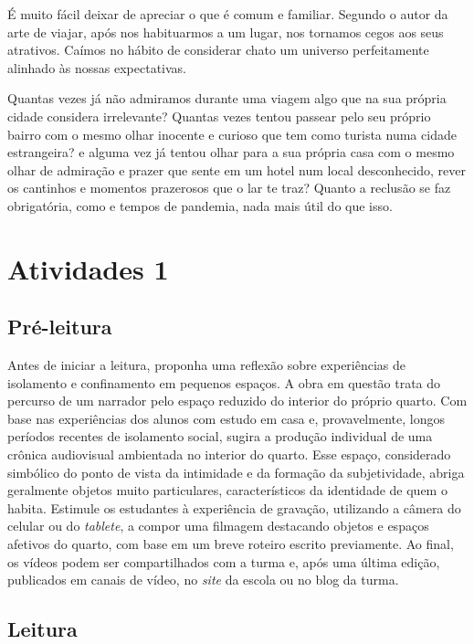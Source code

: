 \documentclass[12pt]{extarticle}
\begin{document}
É muito fácil deixar de apreciar o que é comum e familiar. Segundo o autor da arte de viajar, após nos habituarmos a um lugar, nos tornamos cegos aos seus atrativos. Caímos no hábito de considerar chato um universo perfeitamente alinhado às nossas expectativas.

Quantas vezes já não admiramos durante uma viagem algo que na sua própria cidade considera irrelevante? Quantas vezes tentou passear pelo seu próprio bairro com o mesmo olhar inocente e curioso que tem como turista numa cidade estrangeira? e alguma vez já tentou olhar para a sua própria casa com o mesmo olhar de admiração e prazer que sente em um hotel num local desconhecido, rever os cantinhos e momentos prazerosos que o lar te traz? Quanto a reclusão se faz obrigatória, como e tempos de pandemia, nada mais útil do que isso. 



\section{Atividades 1}


\subsection{Pré-leitura}


Antes de iniciar a leitura, proponha uma reflexão sobre
experiências de isolamento e confinamento em pequenos espaços. A obra em
questão trata do percurso de um narrador pelo espaço reduzido do
interior do próprio quarto. Com base nas experiências dos alunos com
estudo em casa e, provavelmente, longos períodos recentes de isolamento
social, sugira a produção individual de uma crônica audiovisual
ambientada no interior do quarto. Esse espaço, considerado simbólico do
ponto de vista da intimidade e da formação da subjetividade, abriga
geralmente objetos muito particulares, característicos da identidade de
quem o habita. Estimule os estudantes à experiência de gravação,
utilizando a câmera do celular ou do \emph{tablete}, a compor uma
filmagem destacando objetos e espaços afetivos do quarto, com base em um
breve roteiro escrito previamente. Ao final, os vídeos podem ser
compartilhados com a turma e, após uma última edição, publicados em
canais de vídeo, no \emph{site} da escola ou no blog da turma.

\subsection{Leitura}
\end{document}
